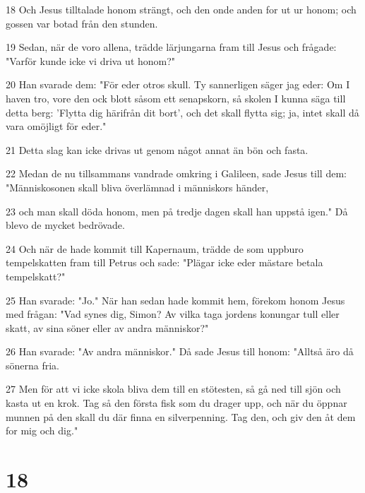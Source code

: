 \par 18 Och Jesus tilltalade honom strängt, och den onde anden for ut ur honom; och gossen var botad från den stunden.
\par 19 Sedan, när de voro allena, trädde lärjungarna fram till Jesus och frågade: "Varför kunde icke vi driva ut honom?"
\par 20 Han svarade dem: "För eder otros skull. Ty sannerligen säger jag eder: Om I haven tro, vore den ock blott såsom ett senapskorn, så skolen I kunna säga till detta berg: 'Flytta dig härifrån dit bort', och det skall flytta sig; ja, intet skall då vara omöjligt för eder."
\par 21 Detta slag kan icke drivas ut genom något annat än bön och fasta.
\par 22 Medan de nu tillsammans vandrade omkring i Galileen, sade Jesus till dem: "Människosonen skall bliva överlämnad i människors händer,
\par 23 och man skall döda honom, men på tredje dagen skall han uppstå igen." Då blevo de mycket bedrövade.
\par 24 Och när de hade kommit till Kapernaum, trädde de som uppburo tempelskatten fram till Petrus och sade: "Plägar icke eder mästare betala tempelskatt?"
\par 25 Han svarade: "Jo." När han sedan hade kommit hem, förekom honom Jesus med frågan: "Vad synes dig, Simon? Av vilka taga jordens konungar tull eller skatt, av sina söner eller av andra människor?"
\par 26 Han svarade: "Av andra människor." Då sade Jesus till honom: "Alltså äro då sönerna fria.
\par 27 Men för att vi icke skola bliva dem till en stötesten, så gå ned till sjön och kasta ut en krok. Tag så den första fisk som du drager upp, och när du öppnar munnen på den skall du där finna en silverpenning. Tag den, och giv den åt dem for mig och dig."

\chapter{18}

